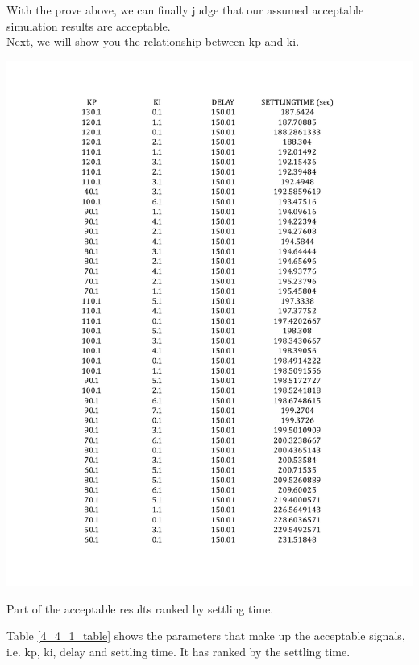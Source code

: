 \documentclass{report}
\begin{document}
With the prove above, we can finally judge that our assumed acceptable simulation results are acceptable.\\

Next, we will show you the relationship between kp and ki.\\

\begin{table}[htbp]
\centering
\includegraphics[width = \textwidth]{figure/4_4_1_table.pdf}
\caption{Part of the acceptable results ranked by settling time.}
\label{4_4_1_table}
\end{table}

 Table \textcolor{red}{\ref{4_4_1_table}} shows the parameters that make up the acceptable signals, i.e. kp, ki, delay and settling time. It has ranked by the settling time. \\
\end{document}
